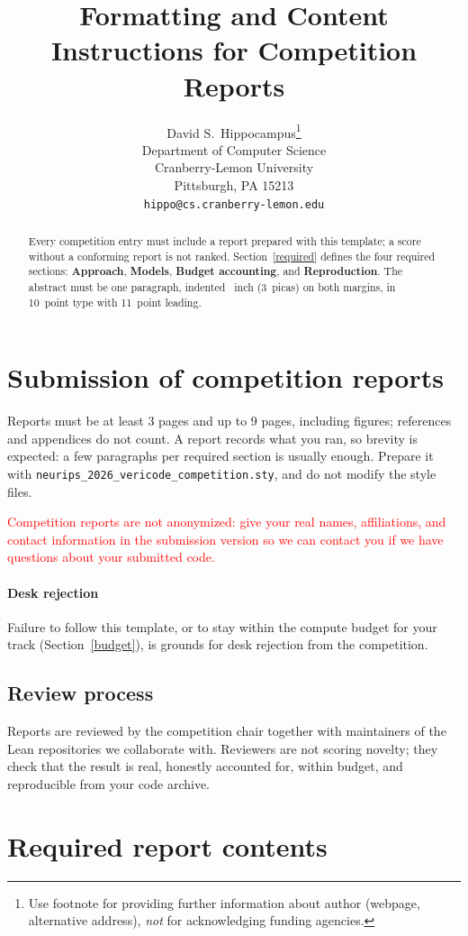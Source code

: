 \documentclass{article}
\title{Formatting and Content Instructions for Competition Reports}
\author{%
  David S.~Hippocampus\thanks{Use footnote for providing further information
    about author (webpage, alternative address), \emph{not} for acknowledging
    funding agencies.} \\
  Department of Computer Science\\
  Cranberry-Lemon University\\
  Pittsburgh, PA 15213 \\
  \texttt{hippo@cs.cranberry-lemon.edu} \\
}
\begin{document}
\maketitle


\begin{abstract}
  Every competition entry must include a report prepared with this template; a score without a conforming report is not ranked. Section~\ref{required} defines the four required sections: \textbf{Approach}, \textbf{Models}, \textbf{Budget accounting}, and \textbf{Reproduction}. The abstract must be one paragraph, indented ~inch (3~picas) on both margins, in 10~point type with 11~point leading.
\end{abstract}


\section{Submission of competition reports}


Reports must be at least 3 pages and up to 9 pages, including figures; references and appendices do not count. A report records what you ran, so brevity is expected: a few paragraphs per required section is usually enough. Prepare it with \verb+neurips_2026_vericode_competition.sty+, and do not modify the style files.

\textcolor{red}{Competition reports are not anonymized: give your real names, affiliations, and contact information in the submission version so we can contact you if we have questions about your submitted code.}

\paragraph{Desk rejection} Failure to follow this template, or to stay within the compute budget for your track (Section~\ref{budget}), is grounds for desk rejection from the competition.


\subsection{Review process}
\label{review}


Reports are reviewed by the competition chair together with maintainers of the Lean repositories we collaborate with. Reviewers are not scoring novelty; they check that the result is real, honestly accounted for, within budget, and reproducible from your code archive.


\section{Required report contents}
\label{required}
\end{document}
